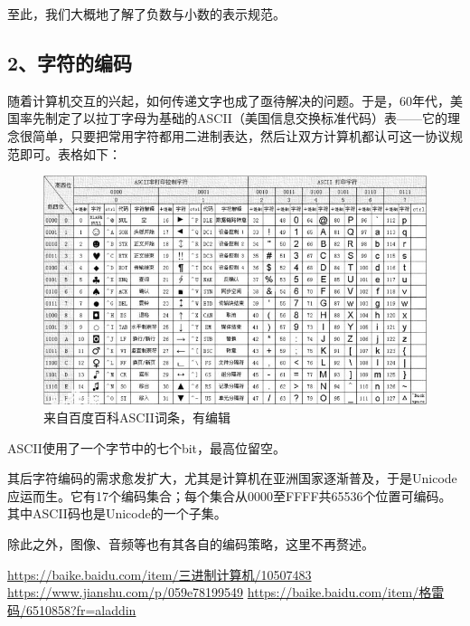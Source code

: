 \documentclass[UTF8]{ctexart}
\begin{document}
至此，我们大概地了解了负数与小数的表示规范。

\subsection*{2、字符的编码}
随着计算机交互的兴起，如何传递文字也成了亟待解决的问题。于是，60年代，美国率先制定了以拉丁字母为基础的ASCII（美国信息交换标准代码）表——它的理念很简单，只要把常用字符都用二进制表达，然后让双方计算机都认可这一协议规范即可。表格如下：

\begin{figure}
\includegraphics[width=16cm]{Fig2.jpg}
\caption*{来自百度百科ASCII词条，有编辑}
\end{figure}
ASCII使用了一个字节中的七个bit，最高位留空。

其后字符编码的需求愈发扩大，尤其是计算机在亚洲国家逐渐普及，于是Unicode应运而生。它有17个编码集合；每个集合从0000至FFFF共65536个位置可编码。其中ASCII码也是Unicode的一个子集。

除此之外，图像、音频等也有其各自的编码策略，这里不再赘述。

\begin{thebibliography}{5}
 \url{https://baike.baidu.com/item/三进制计算机/10507483}
 \url{https://www.jianshu.com/p/059e78199549}
 \url{https://baike.baidu.com/item/格雷码/6510858?fr=aladdin}
\end{thebibliography}
\end{document}
